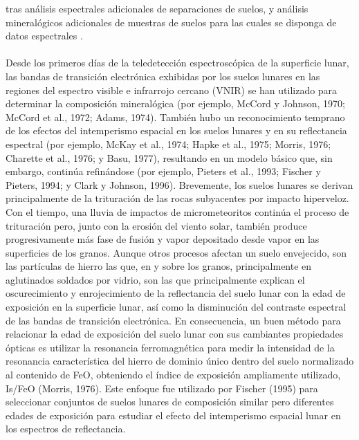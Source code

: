 \documentclass[12pt]{article}
\begin{document}
tras análisis espectrales adicionales de separaciones de suelos, y análisis 
mineralógicos adicionales de muestras de suelos para las cuales se disponga de 
datos espectrales \parencite{SALISBURY1997125}.\\
\\
Desde los primeros días de la teledetección espectroscópica de la superficie lunar, 
las bandas de transición electrónica exhibidas por los suelos lunares en las regiones 
del espectro visible e infrarrojo cercano (VNIR) se han utilizado para determinar la 
composición mineralógica (por ejemplo, McCord y Johnson, 1970; McCord et al., 1972; 
Adams, 1974). También hubo un reconocimiento temprano de los efectos del intemperismo 
espacial en los suelos lunares y en su reflectancia espectral (por ejemplo, McKay et 
al., 1974; Hapke et al., 1975; Morris, 1976; Charette et al., 1976; y Basu, 1977), 
resultando en un modelo básico que, sin embargo, continúa refinándose (por ejemplo, 
Pieters et al., 1993; Fischer y Pieters, 1994; y Clark y Johnson, 1996). Brevemente, 
los suelos lunares se derivan principalmente de la trituración de las rocas subyacentes 
por impacto hiperveloz. Con el tiempo, una lluvia de impactos de micrometeoritos continúa 
el proceso de trituración pero, junto con la erosión del viento solar, también produce 
progresivamente más fase de fusión y vapor depositado desde vapor en las superficies de 
los granos. Aunque otros procesos afectan un suelo envejecido, son las partículas de hierro 
las que, en y sobre los granos, principalmente en aglutinados soldados por vidrio, son 
las que principalmente explican el oscurecimiento y enrojecimiento de la reflectancia del 
suelo lunar con la edad de exposición en la superficie lunar, así como la disminución del 
contraste espectral de las bandas de transición electrónica. En consecuencia, un buen 
método para relacionar la edad de exposición del suelo lunar con sus cambiantes propiedades 
ópticas es utilizar la resonancia ferromagnética para medir la intensidad de la resonancia 
característica del hierro de dominio único dentro del suelo normalizado al contenido de FeO, 
obteniendo el índice de exposición ampliamente utilizado, Is/FeO (Morris, 1976). Este enfoque 
fue utilizado por Fischer (1995) para seleccionar conjuntos de suelos lunares de composición 
similar pero diferentes edades de exposición para estudiar el efecto del intemperismo espacial 
lunar en los espectros de reflectancia.
\end{document}
